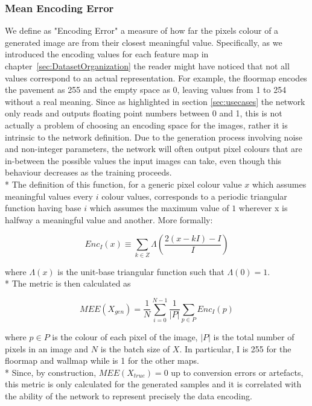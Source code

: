 \subsubsection{Mean Encoding Error}
\label{sec:encodingerror}
We define as "Encoding Error" a measure of how far the pixels colour of a generated image are from their closest meaningful value. Specifically, as we introduced the encoding values for each feature map in chapter~\ref{sec:DatasetOrganization} the reader might have noticed that not all values correspond to an actual representation. For example, the \gls{floormap} encodes the pavement as 255 and the empty space as 0, leaving values from 1 to 254 without a real meaning. Since as highlighted in section \ref{sec:usecases} the network only reads and outputs floating point numbers between 0 and 1, this is not actually a problem of choosing an encoding space for the images, rather it is intrinsic to the network definition. Due to the generation process involving noise and non-integer parameters, the network will often output pixel colours that are in-between the possible values the input images can take, even though this behaviour decreases as the training proceeds. \\*
The definition of this function, for a generic pixel colour value $x$ which assumes meaningful values every $i$ colour values, corresponds to a periodic triangular function having base $i$ which assumes the maximum value of $1$ wherever x is halfway a meaningful value and another. More formally:

\begin{equation}
Enc_{I}(x) \equiv \sum_{k \in Z} \Lambda (\frac{2(x-kI)-I}{I})
\end{equation}


where $ \Lambda(x) $ is the unit-base triangular function such that $ \Lambda(0) = 1 $. \\*
The metric is then calculated as 

\begin{equation}
MEE(X_{gen}) = \frac{1}{N}\sum_{i=0}^{N-1} \frac{1}{|P|} \sum_{p\in P} Enc_I(p)
\end{equation}

where $p\in P$ is the colour of each pixel of the image, $|P|$ is the total number of pixels in an image and $N$ is the batch size of $X$. In particular, I is 255 for the \gls{floormap} and \gls{wallmap} while is 1 for the other maps.  \\*
Since, by construction, $MEE(X_{true}) = 0$ up to conversion errors or artefacts, this metric is only calculated for the generated samples and it is correlated with the ability of the network to represent precisely the data encoding.

